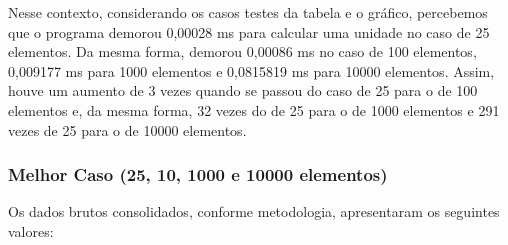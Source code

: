 \documentclass[a4paper, 12pt]{article}
\begin{document}
Nesse contexto, considerando os casos testes da tabela e o gráfico, percebemos que o programa demorou 0,00028 ms para calcular uma unidade no caso de 25 elementos. Da mesma forma, demorou 0,00086 ms no caso de 100 elementos, 0,009177 ms para 1000 elementos e 0,0815819 ms para 10000 elementos. Assim, houve um aumento de 3 vezes quando se passou do caso de 25 para o de 100 elementos e, da mesma forma, 32 vezes do de 25 para o de 1000 elementos e 291 vezes de 25 para o de 10000 elementos.


\subsubsection{Melhor Caso (25, 10, 1000 e 10000 elementos)}

Os dados brutos consolidados, conforme metodologia, apresentaram os seguintes valores:
\vspace{0.2cm}
\end{document}
